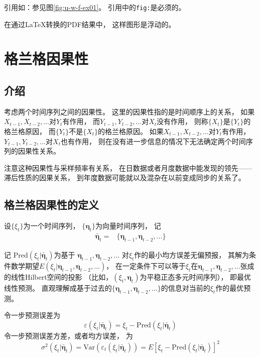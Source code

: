 \documentclass[
  oneside]{book}
\theoremstyle{definition}
\theoremstyle{definition}
\theoremstyle{definition}
\theoremstyle{definition}
\theoremstyle{remark}
\begin{document}
引用如：参见图\ref{fig:u-w-f-ex01}。 引用中的\texttt{fig:}是必须的。

在通过LaTeX转换的PDF结果中， 这样图形是浮动的。

\hypertarget{causal}{%
\chapter{格兰格因果性}\label{causal}}

\hypertarget{causal-intro}{%
\section{介绍}\label{causal-intro}}

考虑两个时间序列之间的因果性。
这里的因果性指的是时间顺序上的关系，
如果\(X_{t-1}, X_{t-2}, \dots\)对\(Y_t\)有作用，
而\(Y_{t-1}, Y_{t-2}, \dots\)对\(X_t\)没有作用，
则称\(\{X_t \}\)是\(\{ Y_t \}\)的格兰格原因，
而\(\{ Y_t \}\)不是\(\{ X_t \}\)的格兰格原因。
如果\(X_{t-1}, X_{t-2}, \dots\)对\(Y_t\)有作用，
\(Y_{t-1}, Y_{t-2}, \dots\)对\(X_t\)也有作用，
则在没有进一步信息的情况下无法确定两个时间序列的因果性关系。

注意这种因果性与采样频率有关系，
在日数据或者月度数据中能发现的领先------滞后性质的因果关系，
到年度数据可能就以及混杂在以前变成同步的关系了。

\hypertarget{causal-def}{%
\section{格兰格因果性的定义}\label{causal-def}}

设\(\{ \xi_t \}\)为一个时间序列，
\(\{ \boldsymbol{\eta}_t \}\)为向量时间序列，
记
\[\begin{aligned}
\bar{\boldsymbol{\eta}}_t =& \{ \boldsymbol{\eta}_{t-1}, \boldsymbol{\eta}_{t-2}, \dots \} 
\end{aligned}\]

记
\(\text{Pred}(\xi_t | \bar{\boldsymbol{\eta}}_t)\)为基于
\(\boldsymbol{\eta}_{t-1}, \boldsymbol{\eta}_{t-2}, \dots\)
对\(\xi_t\)作的最小均方误差无偏预报，
其解为条件数学期望\(E(\xi_t | \boldsymbol{\eta}_{t-1}, \boldsymbol{\eta}_{t-2}, \dots)\)，
在一定条件下可以等于\(\xi_t\)在\(\boldsymbol{\eta}_{t-1}, \boldsymbol{\eta}_{t-2}, \dots\)张成的线性Hilbert空间的投影
（比如，\((\xi_t, \boldsymbol{\eta}_t)\)为平稳正态多元时间序列），
即最优线性预测。
直观理解成基于过去的\(\{\boldsymbol{\eta}_{t-1}, \boldsymbol{\eta}_{t-2}, \dots \}\)的信息对当前的\(\xi_t\)作的最优预测。

令一步预测误差为
\[
  \varepsilon(\xi_t | \bar{\boldsymbol{\eta}}_t) 
  = \xi_t - \text{Pred}(\xi_t | \bar{\boldsymbol{\eta}}_t)
\]
令一步预测误差方差，或者均方误差，
为
\[
  \sigma^2(\xi_t | \bar{\boldsymbol{\eta}}_t)  
  = \text{Var}(\varepsilon_t(\xi_t | \bar{\boldsymbol{\eta}}_t) )
  = E \left[ \xi_t - \text{Pred}(\xi_t | \bar{\boldsymbol{\eta}}_t) \right]^2
\]
\end{document}
